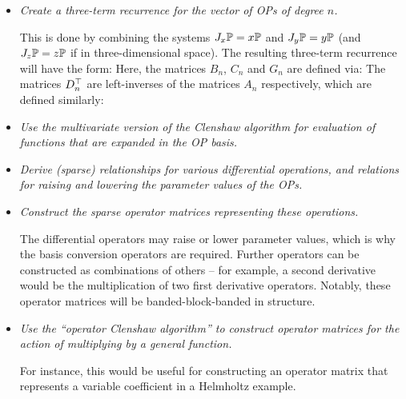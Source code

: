 \begin{itemize}
	\item \textit{Create a three-term recurrence for the vector of OPs of degree $n$.}
	
		This is done by combining the systems $J_x \mathbb{P} = x \mathbb{P}$ and $J_y \mathbb{P} = y \mathbb{P}$ (and $J_z \mathbb{P} = z \mathbb{P}$ if in three-dimensional space). The resulting three-term recurrence will have the form:
		Here, the matrices $B_n$, $C_n$ and $G_n$ are defined via:
		The matrices $D^\top_n$ are left-inverses of the matrices $A_n$ respectively, which are defined similarly:
		
	\item \textit{Use the multivariate version of the Clenshaw algorithm for evaluation of functions that are expanded in the OP basis.}
	
	\item \textit{Derive (sparse) relationships for various differential operations, and relations for raising and lowering the parameter values of the OPs.}
	
	\item \textit{Construct the sparse operator matrices representing these operations.}
		
		The differential operators may raise or lower parameter values, which is why the basis conversion operators are required. Further operators can be constructed as combinations of others -- for example, a second derivative would be the multiplication of two first derivative operators. Notably, these operator matrices will be banded-block-banded in structure.
		
	\item \textit{Use the \enquote{operator Clenshaw algorithm} to construct operator matrices for the action of multiplying by a general function.}
	
		For instance, this would be useful for constructing an operator matrix that represents a variable coefficient in a Helmholtz example.
\end{itemize}


